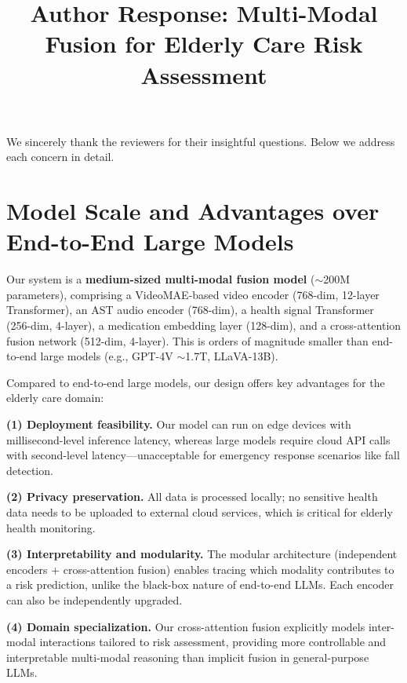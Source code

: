 \documentclass[10pt,twocolumn,letterpaper]{article}
\begin{document}
\title{Author Response: Multi-Modal Fusion for Elderly Care Risk Assessment}

\maketitle
\thispagestyle{empty}
\appendix

We sincerely thank the reviewers for their insightful questions. Below we address each concern in detail.

\section{Model Scale and Advantages over End-to-End Large Models}

Our system is a \textbf{medium-sized multi-modal fusion model} (${\sim}$200M parameters), comprising a VideoMAE-based video encoder (768-dim, 12-layer Transformer), an AST audio encoder (768-dim), a health signal Transformer (256-dim, 4-layer), a medication embedding layer (128-dim), and a cross-attention fusion network (512-dim, 4-layer). This is orders of magnitude smaller than end-to-end large models (e.g., GPT-4V ${\sim}$1.7T, LLaVA-13B).

Compared to end-to-end large models, our design offers key advantages for the elderly care domain:

\noindent\textbf{(1) Deployment feasibility.} Our model can run on edge devices with millisecond-level inference latency, whereas large models require cloud API calls with second-level latency—unacceptable for emergency response scenarios like fall detection.

\noindent\textbf{(2) Privacy preservation.} All data is processed locally; no sensitive health data needs to be uploaded to external cloud services, which is critical for elderly health monitoring.

\noindent\textbf{(3) Interpretability and modularity.} The modular architecture (independent encoders + cross-attention fusion) enables tracing which modality contributes to a risk prediction, unlike the black-box nature of end-to-end LLMs. Each encoder can also be independently upgraded.

\noindent\textbf{(4) Domain specialization.} Our cross-attention fusion explicitly models inter-modal interactions tailored to risk assessment, providing more controllable and interpretable multi-modal reasoning than implicit fusion in general-purpose LLMs.
\end{document}
